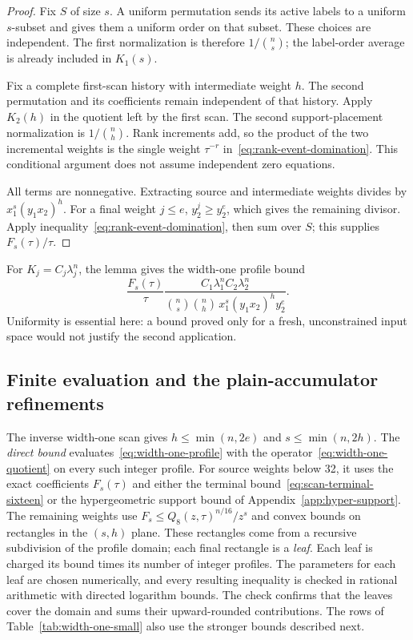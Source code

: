 \begin{proof}
Fix $S$ of size $s$. A uniform permutation sends its active labels to
a uniform $s$-subset and gives them a uniform order on that subset.
These choices are independent. The first normalization is therefore
$1/\binom ns$; the label-order average is already included in $K_1(s)$.

Fix a complete first-scan history with intermediate weight $h$. The
second permutation and its coefficients remain independent of that
history. Apply $K_2(h)$ in the quotient left by the first scan.
The second support-placement normalization is $1/\binom nh$.
Rank increments add, so the product of the two incremental weights is
the single weight $\tau^{-r}$ in~\eqref{eq:rank-event-domination}.
This conditional argument does not assume independent zero equations.

All terms are nonnegative. Extracting source and intermediate weights
divides by $x_1^s(y_1x_2)^h$. For a final weight $j\le e$,
$y_2^j\ge y_2^e$, which gives the remaining divisor. Apply
inequality~\eqref{eq:rank-event-domination}, then sum over $S$; this
supplies $F_s(\tau)/\tau$.
\end{proof}

For $K_j=C_j\lambda_j^n$, the lemma gives the width-one profile bound
\begin{equation}\label{eq:width-one-profile}
 \frac{F_s(\tau)}{\tau}
 \frac{C_1\lambda_1^n C_2\lambda_2^n}
 {\binom ns\binom nh\,x_1^s(y_1x_2)^h y_2^e}.
\end{equation}
Uniformity is essential here: a bound proved only for a fresh,
unconstrained input space would not justify the second application.

\subsection{Finite evaluation and the plain-accumulator refinements}

The inverse width-one scan gives $h\le\min(n,2e)$ and
$s\le\min(n,2h)$. The \emph{direct bound} evaluates~\eqref{eq:width-one-profile}
with the operator~\eqref{eq:width-one-quotient} on every such integer
profile. For source weights below 32, it uses the exact coefficients
$F_s(\tau)$ and either the terminal bound~\eqref{eq:scan-terminal-sixteen}
or the hypergeometric support bound of Appendix~\ref{app:hyper-support}.
The remaining weights use $F_s\le Q_8(z,\tau)^{n/16}/z^s$ and convex
bounds on rectangles in the $(s,h)$ plane. These rectangles come from a
recursive subdivision of the profile domain; each final rectangle is a
\emph{leaf}. Each leaf is charged its bound times its number of integer
profiles. The parameters for each leaf are chosen numerically, and every
resulting inequality is checked in rational arithmetic with directed
logarithm bounds. The check confirms that the leaves cover the domain and
sums their upward-rounded contributions. The rows of
Table~\ref{tab:width-one-small} also use the stronger bounds described next.

